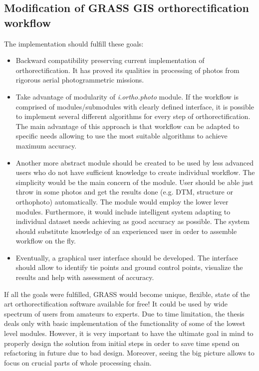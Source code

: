 \documentclass[a4paper,12pt]{article}
\newcommand{\term}[1]{%
{\it #1}%
}
\begin{document}
\subsection{Modification of GRASS GIS orthorectification workflow}

The implementation should fulfill these goals:

\begin{itemize}
\item Backward compatibility preserving current implementation of orthorectification.
It has proved its qualities in processing of photos from rigorous aerial photogrammetric missions.
\item Take advantage of modularity of \term{i.ortho.photo} module.
If the workflow is comprised of modules/submodules with clearly defined interface, it is possible to implement
several different algorithms for every step of orthorectification. The main advantage of this 
approach is that workflow can be adapted to specific needs allowing to use 
the most suitable algorithms to achieve maximum accuracy.
\item Another more abstract module should be created to be used by less advanced users
who do not have sufficient knowledge to create individual 
workflow. The simplicity would be the main concern of the module. User should be able just throw in   
 some photos and get the results done (e.g. DTM, structure or orthophoto) automatically. 
The module would employ the lower lever modules. Furthermore, it would include intelligent system adapting to individual 
dataset needs achieving as good accuracy as possible. 
The system should substitute knowledge of an experienced user in order to assemble workflow on the fly.
\item Eventually, a graphical user interface should be developed. The interface should 
allow to identify tie points and ground control points, visualize the results and help with assessment of accuracy.  
\end{itemize}

If all the goals were fulfilled, GRASS would become unique, flexible, state of the art orthorectification 
software available for free! It could be used by wide spectrum of users from amateurs to experts.
Due to time limitation, the thesis deals only with basic implementation of the functionality of some of the lowest level modules. 
However, it is very important to have 
the ultimate goal in mind to properly design the solution from initial steps in order to save time spend on refactoring in future
 due to bad design. Moreover, seeing the big picture allows to focus on crucial parts of whole processing chain.
\end{document}
